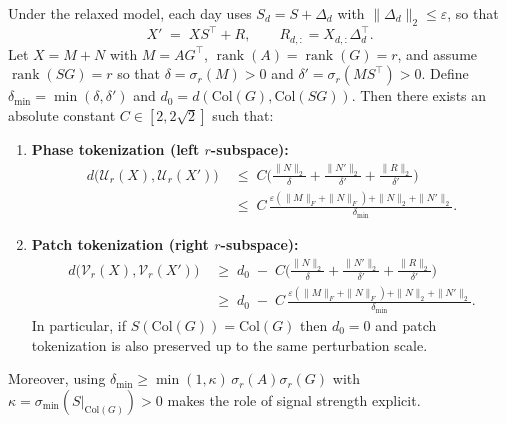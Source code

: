 
\begin{theorem}\label{thm:relaxed}
Under the relaxed model, each day uses $S_d=S+\Delta_d$ with $\|\Delta_d\|_2\le\varepsilon$, so that
\[
X' \;=\; X S^\top + R,\qquad R_{d,:}=X_{d,:}\Delta_d^\top .
\]
Let $X=M+N$ with $M=AG^\top$, $\operatorname{rank}(A)=\operatorname{rank}(G)=r$, and assume
$\operatorname{rank}(SG)=r$ so that $\delta=\sigma_r(M)>0$ and $\delta'=\sigma_r(MS^\top)>0$.
Define $\delta_{\min}=\min(\delta,\delta')$ and $d_0=d(\mathrm{Col}(G),\mathrm{Col}(SG))$.
Then there exists an absolute constant $C\in[2,2\sqrt2]$ such that:
\begin{enumerate}[leftmargin=2em]
\item \textbf{Phase tokenization (left $r$-subspace):}
\[
\begin{aligned}
d\big(\mathcal U_r(X), \mathcal U_r(X')\big)
&\;\le\;
C\Bigg(
   \frac{\|N\|_2}{\delta}
 + \frac{\|N'\|_2}{\delta'}
 + \frac{\|R\|_2}{\delta'}
\Bigg) \\
&\;\le\;
C\,\frac{\varepsilon(\|M\|_F+\|N\|_F)
   + \|N\|_2
   + \|N'\|_2}{\delta_{\min}}.
\end{aligned}
\]

\item \textbf{Patch tokenization (right $r$-subspace):}
\[
\begin{aligned}
d\big(\mathcal V_r(X), \mathcal V_r(X')\big)
&\;\ge\;
d_0 \;-\;
C\Bigg(
   \frac{\|N\|_2}{\delta}
 + \frac{\|N'\|_2}{\delta'}
 + \frac{\|R\|_2}{\delta'}
\Bigg) \\
&\;\ge\;
d_0 \;-\;
C\,\frac{\varepsilon(\|M\|_F+\|N\|_F)
   + \|N\|_2
   + \|N'\|_2}{\delta_{\min}}.
\end{aligned}
\]
In particular, if $S(\mathrm{Col}(G))=\mathrm{Col}(G)$ then $d_0=0$ and patch tokenization is also preserved up to the same perturbation scale.
\end{enumerate}
Moreover, using $\delta_{\min}\ge \min(1,\kappa)\,\sigma_r(A)\sigma_r(G)$ with
$\kappa=\sigma_{\min}(S|_{\mathrm{Col}(G)})>0$ makes the role of signal strength explicit.
\end{theorem}

